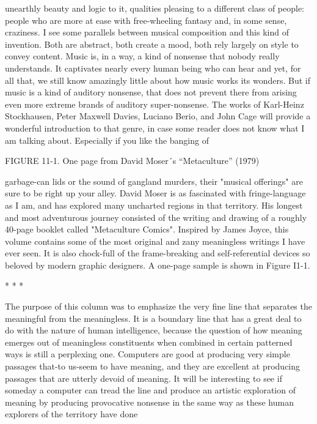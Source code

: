 unearthly beauty and logic to it, qualities pleasing to a different class of people: people
who are more at ease with free-wheeling fantasy and, in some sense, craziness. I see
some parallels between musical composition and this kind of invention. Both are abstract,
both create a mood, both rely largely on style to convey content.
        Music is, in a way, a kind of nonsense that nobody really understands. It
captivates nearly every human being who can hear and yet, for all that, we still know
amazingly little about how music works its wonders. But if music is a kind of auditory
nonsense, that does not prevent there from arising even more extreme brands of auditory
super-nonsense. The works of Karl-Heinz Stockhausen, Peter Maxwell Davies, Luciano
Berio, and John Cage will provide a wonderful introduction to that genre, in case some
reader does not know what I am talking about. Especially if you like the banging of





             FIGURE 11-1. One page from David Moser´s “Metaculture” (1979)





garbage-can lids or the sound of gangland murders, their "musical offerings" are sure to
be right up your alley.
        David Moser is as fascinated with fringe-language as I am, and has explored
many uncharted regions in that territory. His longest and most adventurous journey
consisted of the writing and drawing of a roughly 40-page booklet called "Metaculture
Comics". Inspired by James Joyce, this volume contains some of the most original and
zany meaningless writings I have ever seen. It is also chock-full of the frame-breaking
and self-referential devices so beloved by modern graphic designers. A one-page sample
is shown in Figure I1-1.

                                         *   *   *

         The purpose of this column was to emphasize the very fine line that separates the
meaningful from the meaningless. It is a boundary line that has a great deal to do with the
nature of human intelligence, because the question of how meaning emerges out of
meaningless constituents when combined in certain patterned ways is still a perplexing
one. Computers are good at producing very simple passages that-to us-seem to have
meaning, and they are excellent at producing passages that are utterly devoid of meaning.
It will be interesting to see if someday a computer can tread the line and produce an
artistic exploration of meaning by producing provocative nonsense in the same way as
these human explorers of the territory have done






